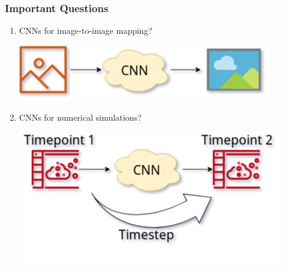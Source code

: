 \documentclass[18pt]{beamer}
\begin{document}
\begin{frame}
  \frametitle{Important Questions}

  \begin{enumerate}

  \item CNNs for image-to-image mapping?
    \vspace{0.7cm}
    \begin{center}
      \includegraphics[scale=0.45]{images/image_to_image_cnn}
    \end{center}

    \vspace{0.5cm}
  \item CNNs for numerical simulations?
    \vspace{0.5cm}
    \begin{center}
      \includegraphics[scale=0.45]{images/system_to_system_cnn}
    \end{center}
    
  \end{enumerate}  
\end{frame}
\end{document}
